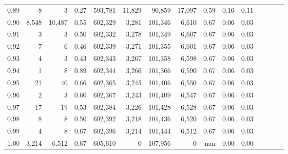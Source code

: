 \begin{tabular}{rrrcrrrrrrrrrrr}
0.89 &       8 &       3 &                                       0.27 &  593,781 &   11,829 &   90,859 &   17,097 &  0.59 &  0.16 &                         0.11 \\
0.90 &   8,548 &  10,487 &                                       0.55 &  602,329 &    3,281 &  101,346 &    6,610 &  0.67 &  0.06 &                         0.03 \\
0.91 &       3 &       3 &                                       0.50 &  602,332 &    3,278 &  101,349 &    6,607 &  0.67 &  0.06 &                         0.03 \\
0.92 &       7 &       6 &                                       0.46 &  602,339 &    3,271 &  101,355 &    6,601 &  0.67 &  0.06 &                         0.03 \\
0.93 &       4 &       3 &                                       0.43 &  602,343 &    3,267 &  101,358 &    6,598 &  0.67 &  0.06 &                         0.03 \\
0.94 &       1 &       8 &                                       0.89 &  602,344 &    3,266 &  101,366 &    6,590 &  0.67 &  0.06 &                         0.03 \\
0.95 &      21 &      40 &                                       0.66 &  602,365 &    3,245 &  101,406 &    6,550 &  0.67 &  0.06 &                         0.03 \\
0.96 &       2 &       3 &                                       0.60 &  602,367 &    3,243 &  101,409 &    6,547 &  0.67 &  0.06 &                         0.03 \\
0.97 &      17 &      19 &                                       0.53 &  602,384 &    3,226 &  101,428 &    6,528 &  0.67 &  0.06 &                         0.03 \\
0.98 &       8 &       8 &                                       0.50 &  602,392 &    3,218 &  101,436 &    6,520 &  0.67 &  0.06 &                         0.03 \\
0.99 &       4 &       8 &                                       0.67 &  602,396 &    3,214 &  101,444 &    6,512 &  0.67 &  0.06 &                         0.03 \\
1.00 &   3,214 &   6,512 &                                       0.67 &  605,610 &        0 &  107,956 &        0 &   nan &  0.00 &                         0.00 \\
\bottomrule
\end{tabular}

